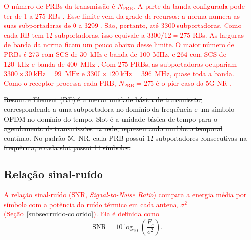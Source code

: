 \textcolor{red}{O número de PRBs da transmissão é $N_{\text{PRB}}$. A parte da banda configurada pode ter de 1 a 275 RBs \cite[p.~367]{lin-lee-5g}. Esse limite vem da grade de recursos: a norma numera as suas subportadoras de 0 a 3299 \cite[Sec.~4.4.2]{3gpp-ts38211}. São, portanto, até 3300 subportadoras. Como cada RB tem 12 subportadoras, isso equivale a $3300/12 = 275$ RBs. As larguras de banda da norma ficam um pouco abaixo desse limite. O maior número de PRBs é 273 com SCS de 30~kHz e banda de 100~MHz, e 264 com SCS de 120~kHz e banda de 400~MHz \cite[Tabs.~5.3.2-1 e 5.3.2-2]{3gpp-ts38104}. Com 275 PRBs, as subportadoras ocupariam $3300 \times 30~\text{kHz} = 99$~MHz e $3300 \times 120~\text{kHz} = 396$~MHz, quase toda a banda. Como o receptor processa cada PRB, $N_{\text{PRB}} = 275$ é o pior caso do 5G NR \cite{zhao2025jsac}.}


\sout{Resource Element (RE) é a menor unidade básica de transmissão, correspondendo a uma subportadora no domínio da frequência e um símbolo OFDM no domínio do tempo.  Slot é a unidade básica de tempo para o agendamento de transmissões na rede, representando um bloco temporal contínuo. No padrão 5G NR, cada PRB possui 12 subportadores consecutivas na frequência, e cada slot possui 14 símbolos.} 

\subsection{Relação sinal-ruído}\label{subsec:snr}
\textcolor{red}{A relação sinal-ruído (SNR, \textit{Signal-to-Noise Ratio}) compara a energia média por símbolo com a potência do ruído térmico em cada antena, $\sigma^2$ (Seção~\ref{subsec:ruido-colorido}). Ela é definida como \cite{zhao2025jsac}}
\begin{equation}
\mathrm{SNR}=10\log_{10}\left(\frac{E_s}{\sigma^2}\right).
\label{eq:snr}
\end{equation}
